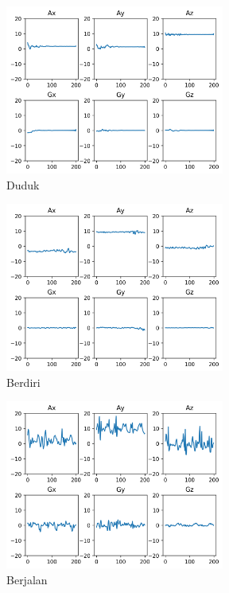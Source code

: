\begin{figure}[h!]
    \begin{subfigure}{0.5\textwidth}
        \includegraphics[width=7.2cm]{data/plot-sensor/duduk.png}
        \caption{Duduk}
        \label{gambar:plot-sensor-duduk}
    \end{subfigure}
    \begin{subfigure}{0.5\textwidth}
        \includegraphics[width=7.2cm]{data/plot-sensor/berdiri.png}
        \caption{Berdiri}
        \label{gambar:plot-sensor-berdiri}
    \end{subfigure}
    \begin{subfigure}{0.5\textwidth}
        \includegraphics[width=7.2cm]{data/plot-sensor/berjalan.png}
        \caption{Berjalan}
        \label{gambar:plot-sensor-berjalan}
    \end{subfigure}
    \begin{subfigure}{0.5\textwidth}

\end{subfigure}
\end{figure}
